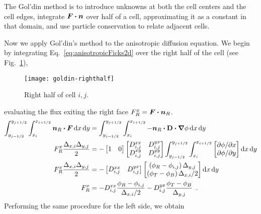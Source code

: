 The Gol'din method is to introduce unknowns at both the cell centers and the
cell edges, integrate $\bm{F}\bm{\cdot} \bm{n}$ over half of a cell, approximating
it as a constant in that domain, and use
particle conservation to relate adjacent cells.

Now we apply Gol'din's method to the anisotropic diffusion equation. We begin
by integrating Eq.~\eqref{eq:anisotropicFicks2d} over the right half of the
cell (see Fig.~\ref{fig:goldinRight}),
\begin{figure}[htb]
  \centering
  \texttt{[image: goldin-righthalf]}
  \caption{Right half of cell $i,j$.}
  \label{fig:goldinRight}
\end{figure}
evaluating the flux exiting the right face $F_R^x = \bm{F}\bm{\cdot}\bm{n}_R$.
\begin{align*}
\int_{y_{j-1/2}}^{y_{j+1/2}} \int_{x_{i}}^{x_{i+1/2}}
\vec{n}_R \vd \vec{F}
\ud x \ud y
&=
\int_{y_{j-1/2}}^{y_{j+1/2}} \int_{x_{i}}^{x_{i+1/2}}
-\vec{n}_R \vd \Dtens \vd \grad \phi
\ud x \ud y
\\
F_R^x \frac{\Delta_{x,i} \Delta_{y,j}}{2}
&=
-
\begin{bmatrix}
  1 & 0
\end{bmatrix}
\begin{bmatrix}
  D_{i,j}^{xx} & D_{i,j}^{yx} \\
  D_{i,j}^{xy} & D_{i,j}^{yy}
\end{bmatrix}
\int_{y_{j-1/2}}^{y_{j+1/2}} \int_{x_{i}}^{x_{i+1/2}}
\begin{bmatrix}
  \tpder{\phi}{x} \\
  \tpder{\phi}{y}
\end{bmatrix}
\ud x \ud y
\\
F_R^x \frac{\Delta_{x,i} \Delta_{y,j}}{2}
&=
-
\begin{bmatrix}
  D_{i,j}^{xx} & D_{i,j}^{yx}
\end{bmatrix}
\begin{bmatrix}
  \left( \phi_R - \phi_{i,j} \right) \Delta_{y,j} \\
  \left( \phi_T - \phi_B \right) \Delta_{x,i} / 2
\end{bmatrix}
\ud x \ud y
\\
F_R^x
&= 
- D_{i,j}^{xx} \frac{\phi_R - \phi_{i,j}}{ \Delta_{x,i} / 2}
- D_{i,j}^{yx} \frac{\phi_T - \phi_B}{ \Delta_{y,j} }\ \,.
\end{align*}
Performing the same procedure for the left side, we obtain
